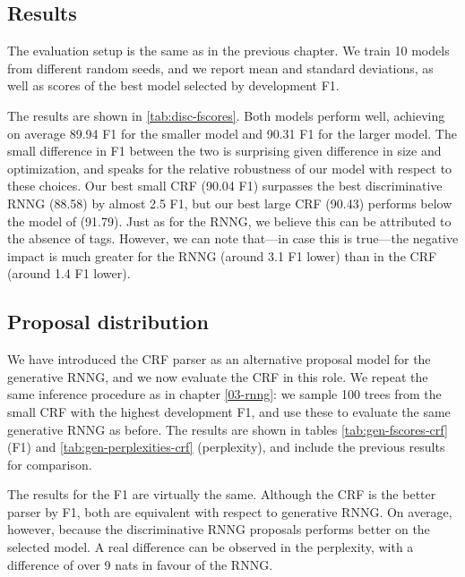   \subsection{Results}
    The evaluation setup is the same as in the previous chapter. We train 10 models from different random seeds, and we report mean and standard deviations, as well as scores of the best model selected by development F1.

    

    The results are shown in \ref{tab:disc-fscores}. Both models perform well, achieving on average 89.94 F1 for the smaller model and 90.31 F1 for the larger model. The small difference in F1 between the two is surprising given difference in size and optimization, and speaks for the relative robustness of our model with respect to these choices. Our best small CRF (90.04 F1) surpasses the best discriminative RNNG (88.58) by almost 2.5 F1, but our best large CRF (90.43) performs below the model of \citet{stern2017minimal} (91.79). Just as for the RNNG, we believe this can be attributed to the absence of tags. However, we can note that---in case this is true---the negative impact is much greater for the RNNG (around 3.1 F1 lower) than in the CRF (around 1.4 F1 lower).

  \subsection{Proposal distribution}
    We have introduced the CRF parser as an alternative proposal model for the generative RNNG, and we now evaluate the CRF in this role. We repeat the same inference procedure as in chapter \ref{03-rnng}: we sample 100 trees from the small CRF with the highest development F1, and use these to evaluate the same generative RNNG as before. The results are shown in tables \ref{tab:gen-fscores-crf} (F1) and \ref{tab:gen-perplexities-crf} (perplexity), and include the previous results for comparison.

    

    

    The results for the F1 are virtually the same. Although the CRF is the better parser by F1, both are equivalent with respect to generative RNNG. On average, however, because the discriminative RNNG proposals performs better on the selected model. A real difference can be observed in the perplexity, with a difference of over 9 nats in favour of the RNNG.

